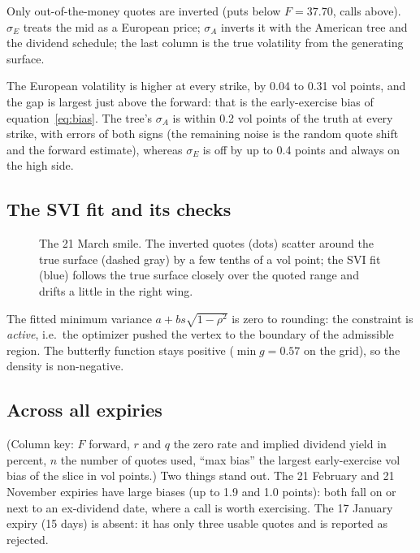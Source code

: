 \documentclass[11pt]{article}
\begin{document}
Only out-of-the-money quotes are inverted (puts below $F=37.70$, calls above).
$\sigma_E$ treats the mid as a European price; $\sigma_A$ inverts it with the
American tree and the dividend schedule; the last column is the true volatility
from the generating surface.



The European volatility is higher at every strike, by 0.04 to 0.31 vol points,
and the gap is largest just above the forward: that is the early-exercise
bias of equation~\eqref{eq:bias}. The tree's $\sigma_A$ is within 0.2 vol points
of the truth at every strike, with errors of both signs (the remaining noise is
the random quote shift and the forward estimate), whereas $\sigma_E$ is off by up
to 0.4 points and always on the high side.

\subsection{The SVI fit and its checks}

\begin{figure}[ht]
\centering

\caption{The 21 March smile. The inverted quotes (dots) scatter around the
true surface (dashed gray) by a few tenths of a vol point; the SVI fit (blue)
follows the true surface closely over the quoted range and drifts a little in
the right wing.}
\end{figure}

\begin{center}
\begin{minipage}{0.48\textwidth}

\end{minipage}
\end{center}

The fitted minimum variance $a+bs\sqrt{1-\rho^2}$ is zero to rounding: the
constraint is \emph{active}, i.e.\ the optimizer pushed the vertex to the
boundary of the admissible region. The butterfly function stays positive
($\min g=\mathbf{0.57}$ on the grid), so the density is non-negative.

\subsection{Across all expiries}



(Column key: $F$ forward, $r$ and $q$ the zero rate and implied dividend yield in
percent, $n$ the number of quotes used, ``max bias'' the largest early-exercise
vol bias of the slice in vol points.) Two things stand out. The 21 February
and 21 November expiries have large biases (up to 1.9 and 1.0 points): both fall
on or next to an ex-dividend date, where a call is worth exercising. The 17
January expiry (15 days) is absent: it has only three usable quotes and is
reported as rejected.
\end{document}
